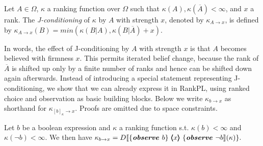 \documentclass{llncs}
\newcommand{\mods}[2]{[#2]_{#1}}
\newcommand{\dn}[1]{D\llbracket #1 \rrbracket}
\newcommand{\Rank}[1]{\hspace{3pt} \pmb{\langle} #1 \pmb{\rangle}\hspace{3pt} } %
\begin{document}
\begin{definition}\label{defn:resultoriented}
Let $A \in \Omega$, $\kappa$ a ranking function over $\Omega$ such that $\kappa(A), \kappa(\overline A) < \infty$, and $x$ a rank.
The \emph{J-conditioning} of $\kappa$ by $A$ with strength $x$, denoted by $\kappa_{A \rightarrow x}$, is defined by
	$\kappa_{A \rightarrow x}(B) = min ( \kappa(B | A), \kappa(B | \overline A) + x ).$ %
\end{definition}

In words, the effect of J-conditioning by $A$ with strength $x$ is that $A$ becomes believed with firmness $x$.
This permits iterated belief change, because the rank of $\overline A$ is shifted up only by a finite number of ranks
	and hence can be shifted down again afterwards. %
Instead of introducing a special statement representing J-conditioning, we show that we can already express it in RankPL, 
	using ranked choice and observation as basic building blocks.
Below we write $\kappa_{b \rightarrow x}$ as shorthand for $\kappa_{\mods{\kappa}{b} \rightarrow x}$.
Proofs are omitted due to space constraints.
\begin{theorem}
Let $b$ be a boolean expression and $\kappa$ a ranking function s.t. $\kappa(b) < \infty$ and $\kappa(\neg b) < \infty$.
We then have
$\kappa_{b \rightarrow x} = \dn{\{\emph{\textbf{observe }}b \}\Rank{x} \{\emph{\textbf{observe }}\neg b}(\kappa)\}.$ %
\end{theorem}
\end{document}
